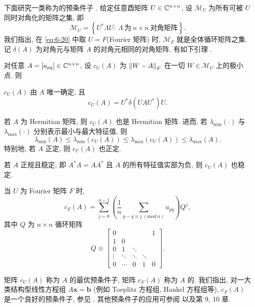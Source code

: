 下面研究一类称为的预条件子 \cite{src:16,src:18,src:21,src:42,src:43}. 给定任意酉矩阵 $U\in\mathbb{C}^{n\times n}$, 设 $\mathcal{M}_U$ 为所有可被 $U$ 同时对角化的矩阵之集, 即
\begin{equation}
  \mathcal{M}_U=\left\{U^*\Lambda U:
  \ \Lambda\ \text{为}\ n\times n\ \text{对角矩阵}\right\}.
  \label{eq:6-20}
\end{equation}
我们指出, 在 \eqref{eq:6-20} 中取 $U=F$(Fourier 矩阵) 时, $\mathcal{M}_F$ 就是全体循环矩阵之集. 记 $\delta(A)$ 为对角元与矩阵 $A$ 的对角元相同的对角矩阵. 有如下引理 \cite{src:16,src:42,src:43,src:51,src:82}.

\begin{lemma}
\label{lem:6-2}
对任意 $A=[a_{pq}]\in\mathbb{C}^{n\times n}$, 设 $c_U(A)$ 为 $\left\|W-A\right\|_F$ 在一切 $W\in\mathcal{M}_U$ 上的极小点. 则
\begin{romanlist}
  \item $c_U(A)$ 由 $A$ 唯一确定, 且
    \[
      c_U(A)=U^*\delta(UAU^*)U.
    \]
  \item 若 $A$ 为 Hermitian 矩阵, 则 $c_U(A)$ 也是 Hermitian 矩阵. 进而, 若 $\lambda_{\min}(\cdot)$ 与 $\lambda_{\max}(\cdot)$ 分别表示最小与最大特征值, 则
    \[
      \lambda_{\min}(A)\leqslant\lambda_{\min}(c_U(A))
      \leqslant\lambda_{\max}(c_U(A))\leqslant\lambda_{\max}(A).
    \]
    特别地, 若 $A$ 正定, 则 $c_U(A)$ 也正定.
  \item 若 $A$ 正规且稳定, 即 $A^*A=AA^*$ 且 $A$ 的所有特征值实部为负, 则 $c_U(A)$ 也稳定.
  \item 当 $U$ 为 Fourier 矩阵 $F$ 时,
    \[
      c_F(A)=\sum_{j=0}^{n-1}
      \left(\frac{1}{n}\sum_{p-q\equiv j\ (\mathrm{mod}\ n)}a_{pq}\right)Q^j,
    \]
    其中 $Q$ 为 $n\times n$ 循环矩阵
    \[
      Q\equiv\begin{bmatrix}
        0 & & & & 1\\
        1 & 0 & & & \\
        0 & 1 & \ddots & & \\
        \vdots & \ddots & \ddots & \ddots & \\
        0 & \cdots & 0 & 1 & 0
      \end{bmatrix}.
    \]
\end{romanlist}
\end{lemma}

矩阵 $c_U(A)$ 称为 $A$ 的最优预条件子, 矩阵 $c_F(A)$ 称为 $A$ 的. 我们指出, 对一大类结构型线性方程组 $A\mathbf{x}=\mathbf{b}$ (例如 Toeplitz 方程组, Hankel 方程组等), $c_F(A)$ 是一个良好的预条件子, 参见 \cite{src:16,src:18,src:21,src:25,src:42,src:43,src:49,src:50,src:52}. 其他预条件子的应用可参阅 \cite{src:4,src:67,src:97} 以及第 9, 10 章.

